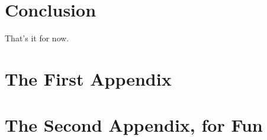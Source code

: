 \documentclass[12pt,twoside]{reedthesis}
\theoremstyle{definition}
\theoremstyle{remark}
\theoremstyle{plain}
\begin{document}
\chapter{Conclusion}
\setcounter{chapter}{4}
\setcounter{section}{0}

That's it for now.

\appendix
\chapter{The First Appendix}
\chapter{The Second Appendix, for Fun}



\backmatter%

\nocite{*}


% 
\printbibliography[heading=bibintoc]
% 

\end{document}

